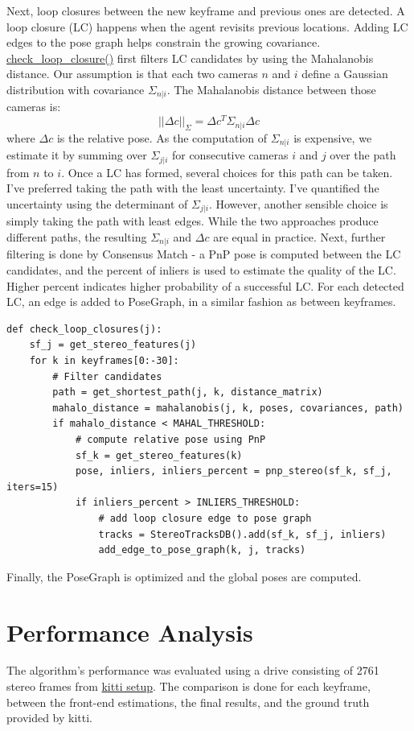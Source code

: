 \documentclass[12pt]{article}
\begin{document}
Next, loop closures between the new keyframe and previous ones are detected. A loop closure (LC) happens when the agent revisits previous locations. Adding LC edges to the pose graph helps constrain the growing covariance.  \href{TODO}{check_loop_closure()} first filters LC candidates by using the Mahalanobis distance. Our assumption is that each two cameras $n$ and $i$ define a Gaussian distribution with covariance $\Sigma_{n|i}$. The Mahalanobis distance between those cameras is: 
\[ ||\Delta c||_{\Sigma} = \Delta c^{T} \Sigma_{n|i} \Delta c \]
where $\Delta c$ is the relative pose. As the computation of $\Sigma_{n|i}$ is expensive, we estimate it by summing over $\Sigma_{j|i}$ for consecutive cameras $i$ and $j$ over the path from $n$ to $i$. Once a LC has formed, several choices for this path can be taken. I've preferred taking the path with the least uncertainty. I've quantified the uncertainty using the determinant of $\Sigma_{j|i}$. However, another sensible choice is simply taking the path with least edges. While the two approaches produce different paths, the resulting $\Sigma_{n|i}$ and $\Delta c$ are equal in practice. Next, further filtering is done by Consensus Match - a PnP pose is computed between the LC candidates, and the percent of inliers is used to estimate the quality of the LC. Higher percent indicates higher probability of a successful LC. For each detected LC, an edge is added to PoseGraph, in a similar fashion as between keyframes.
\begin{tcolorbox}  
\begin{verbatim}
def check_loop_closures(j):
    sf_j = get_stereo_features(j)
    for k in keyframes[0:-30]:
        # Filter candidates
        path = get_shortest_path(j, k, distance_matrix)
        mahalo_distance = mahalanobis(j, k, poses, covariances, path)
        if mahalo_distance < MAHAL_THRESHOLD:
            # compute relative pose using PnP
            sf_k = get_stereo_features(k)
            pose, inliers, inliers_percent = pnp_stereo(sf_k, sf_j, iters=15)
            if inliers_percent > INLIERS_THRESHOLD:
                # add loop closure edge to pose graph
                tracks = StereoTracksDB().add(sf_k, sf_j, inliers)
                add_edge_to_pose_graph(k, j, tracks)
\end{verbatim} 
\end{tcolorbox}
Finally, the PoseGraph is optimized and the global poses are computed.

\newpage

\section{Performance Analysis}
The algorithm's performance was evaluated using a drive consisting of 2761 stereo frames from \href{http://www.cvlibs.net/datasets/kitti/setup.php}{kitti setup}. The comparison is done for each keyframe, between the front-end estimations, the final results, and the ground truth provided by kitti. 
\end{document}
